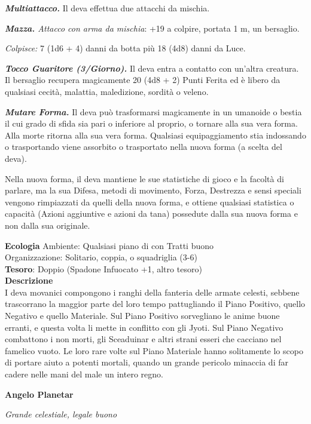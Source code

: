 \begin{multicols}{2}
	\textit{\textbf{Multiattacco.}} Il deva effettua due attacchi da mischia.

	\textit{\textbf{Mazza.} Attacco con arma da mischia}: +19 a colpire, portata 1 m, un bersaglio.

	\textit{Colpisce:} 7 (1d6 + 4) danni da botta più 18 (4d8) danni da Luce.

	\textit{\textbf{Tocco Guaritore (3/Giorno).}} Il deva entra a contatto con un'altra creatura. Il bersaglio recupera magicamente 20 (4d8 + 2) Punti Ferita ed è libero da qualsiasi cecità, malattia, maledizione, sordità o veleno.

	\textit{\textbf{Mutare Forma.}} Il deva può trasformarsi magicamente in un umanoide o bestia il cui grado di sfida sia pari o inferiore al proprio, o tornare alla sua vera forma. Alla morte ritorna alla sua vera forma. Qualsiasi equipaggiamento stia indossando o trasportando viene assorbito o trasportato nella nuova forma (a scelta del deva).

	Nella nuova forma, il deva mantiene le sue statistiche di gioco e la facoltà di parlare, ma la sua Difesa, metodi di movimento, Forza, Destrezza e sensi speciali vengono rimpiazzati da quelli della nuova forma, e ottiene qualsiasi statistica o capacità (Azioni aggiuntive e azioni da tana) possedute dalla sua nuova forma e non dalla sua originale.

	\textbf{Ecologia}
	Ambiente: Qualsiasi piano di con Tratti buono\\
	Organizzazione: Solitario, coppia, o squadriglia (3-6)\\
	\textbf{Tesoro}: Doppio (Spadone Infuocato +1, altro tesoro)\\
	\textbf{Descrizione}\\
	I deva movanici compongono i ranghi della fanteria delle armate celesti, sebbene trascorrano la maggior parte del loro tempo pattugliando il Piano Positivo, quello Negativo e quello Materiale. Sul Piano Positivo sorvegliano le anime buone erranti, e questa volta li mette in conflitto con gli Jyoti. Sul Piano Negativo combattono i non morti, gli Sceaduinar e altri strani esseri che cacciano nel famelico vuoto. Le loro rare volte sul Piano Materiale hanno solitamente lo scopo di portare aiuto a potenti mortali, quando un grande pericolo minaccia di far cadere nelle mani del male un intero regno.

	\medskip{}\textbf{Angelo Planetar}

	\textit{Grande celestiale, legale buono}


\end{multicols}
